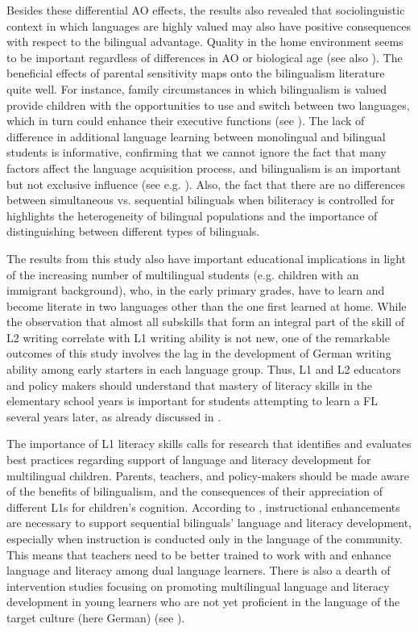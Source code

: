 \documentclass[output=paper,modfonts,nonflat,newtxmath]{langsci/langscibook}
\begin{document}
Besides these differential AO effects, the results also revealed that sociolinguistic context in which languages are highly valued may also have positive consequences with respect to the bilingual advantage. Quality in the home environment seems to be important regardless of differences in AO or biological age (see also \citealt{PfenningerSingleton2019}). The beneficial effects of parental sensitivity maps onto the bilingualism literature quite well. For instance, family circumstances in which bilingualism is valued provide children with the opportunities to use and switch between two languages, which in turn could enhance their executive functions (see \citealt{GoriotEtAl2016}). The lack of difference in additional language learning between monolingual and bilingual students is informative, confirming that we cannot ignore the fact that many factors affect the language acquisition process, and bilingualism is an important but not exclusive influence (see e.g. \citealt{Cenoz2009}). Also, the fact that there are no differences between simultaneous vs. sequential bilinguals when biliteracy is controlled for highlights the heterogeneity of bilingual populations and the importance of distinguishing between different types of bilinguals.

The results from this study also have important educational implications in light of the increasing number of multilingual students (e.g. children with an immigrant background), who, in the early primary grades, have to learn and become literate in two languages other than the one first learned at home. While the observation that almost all subskills that form an integral part of the skill of L2 writing correlate with L1 writing ability is not new, one of the remarkable outcomes of this study involves the lag in the development of German writing ability among early starters in each language group. Thus, L1 and L2 educators and policy makers should understand that mastery of literacy skills in the elementary school years is important for students attempting to learn a FL several years later, as already discussed in \citet{Pfenninger2014}.

The importance of L1 literacy skills calls for research that identifies and evaluates best practices regarding support of language and literacy development for multilingual children. Parents, teachers, and policy-makers should be made aware of the benefits of bilingualism, and the consequences of their appreciation of different L1s for children’s cognition. According to \citet{GoldenbergEtAl2006}, instructional enhancements are necessary to support sequential bilinguals’ language and literacy development, especially when instruction is conducted only in the language of the community. This means that teachers need to be better trained to work with and enhance language and literacy among dual language learners. There is also a dearth of intervention studies focusing on promoting multilingual language and literacy development in young learners who are not yet proficient in the language of the target culture (here German) (see \citealt{AugustShanahan2006}).
\end{document}
